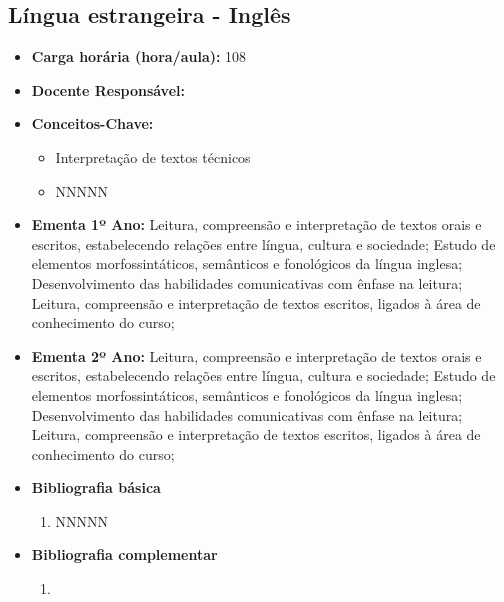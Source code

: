 \documentclass[11pt,fleqn]{book} %
\begin{document}
\subsection{Língua estrangeira - Inglês}\label{disc:ingles}
\begin{itemize}
	\item \textbf{Carga horária (hora/aula):} 108
	\item \textbf{Docente Responsável:}
	\item \textbf{Conceitos-Chave:}
	\begin{itemize}
		\item Interpretação de textos técnicos
		\item NNNNN
	\end{itemize}
	\item \textbf{Ementa 1º Ano:} 
	Leitura, compreensão e interpretação de textos orais e escritos, estabelecendo relações entre língua, cultura e sociedade;
	Estudo de elementos morfossintáticos, semânticos e fonológicos da língua inglesa;
	Desenvolvimento das habilidades comunicativas com ênfase na leitura;
	Leitura, compreensão e interpretação de textos escritos, ligados à área de conhecimento do curso;
	\item \textbf{Ementa 2º Ano:} 
	Leitura, compreensão e interpretação de textos orais e escritos, estabelecendo relações entre língua, cultura e sociedade;
	Estudo de elementos morfossintáticos, semânticos e fonológicos da língua inglesa;
	Desenvolvimento das habilidades comunicativas com ênfase na leitura;
	Leitura, compreensão e interpretação de textos escritos, ligados à área de conhecimento do curso;	
	\item \textbf{Bibliografia básica}
	\begin{enumerate}
		\item NNNNN
	\end{enumerate}
	\item \textbf{Bibliografia complementar}
	\begin{enumerate}
		\item 
	\end{enumerate}	
\end{itemize}

\newpage
\end{document}
